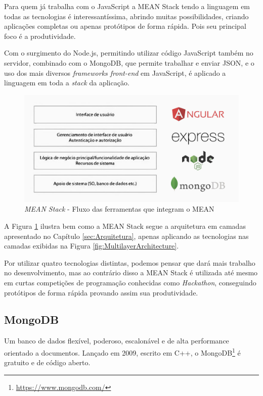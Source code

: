 \documentclass[
	12pt,				%
	openright,			%
	twoside,			%
	a4paper,			%
	english,			%
	brazil				%
	]{abntex2}
\begin{document}
Para quem já trabalha com o JavaScript a MEAN Stack tendo a linguagem em todas as tecnologias é interessantíssima, abrindo muitas possibilidades, criando aplicações completas ou apenas protótipos de forma rápida. Pois seu principal foco é a produtividade.

Com o surgimento do Node.js, permitindo utilizar código JavaScript também no servidor, combinado com o MongoDB, que permite trabalhar e enviar JSON, e o uso dos mais diversos \textit{frameworks front-end} em JavaScript, é aplicado a linguagem em toda a \textit{stack} da aplicação.

\begin{figure}[h]
	\centering

	\caption{\textit{MEAN Stack} - Fluxo das ferramentas que integram o MEAN} \label{fig:MEANStackFlow}
    \includegraphics[scale=0.4]{mean-stack-flow}

\end{figure}

A Figura \ref{fig:MEANStackFlow} ilustra bem como a MEAN Stack segue a arquitetura em camadas apresentado no Capítulo \ref{sec:Arquitetura}, apenas aplicando as tecnologias nas camadas exibidas na Figura \ref{fig:MultilayerArchitecture}.

Por utilizar quatro tecnologias distintas, podemos pensar que dará mais trabalho no desenvolvimento, mas ao contrário disso a MEAN Stack é utilizada até mesmo em curtas competições de programação conhecidas como \textit{Hackathon}, conseguindo protótipos de forma rápida provando assim sua produtividade.

\subsection{MongoDB}

Um banco de dados flexível, poderoso, escalonável e de alta performance orientado a documentos. Lançado em 2009, escrito em C++, o MongoDB\footnote{\url{https://www.mongodb.com/}} é gratuito e de código aberto.
\end{document}
